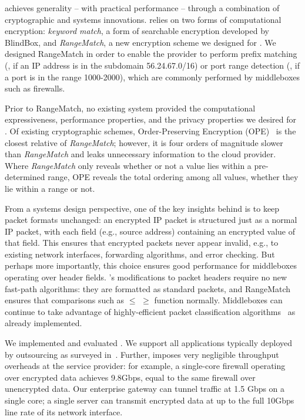 
    \sys achieves generality -- with practical performance -- through a combination of cryptographic and systems innovations.
    \sys relies on two forms of computational encryption: {\it keyword match}, a form of searchable encryption developed by BlindBox,  and {\it RangeMatch}, a new encryption scheme we designed for \sys.
    We designed RangeMatch in order to enable the provider to perform prefix matching (\eg{}, if an IP address is in the subdomain 56.24.67.0/16) or port range detection (\eg{}, if a port is in the range 1000-2000), which are commonly performed by middleboxes such as firewalls. 

    Prior to RangeMatch, no existing system provided the computational expressiveness, performance properties, and the privacy properties we desired for \sys.
    Of existing cryptographic schemes, Order-Preserving Encryption (OPE)~\cite{boldyreva:ope,popa:mope,popa:cryptdb} is the closest relative of {\it RangeMatch}; however, it is four orders of magnitude slower than {\it RangeMatch} and leaks unnecessary information to the cloud provider.
    Where {\em RangeMatch} only reveals whether or not a value lies within a pre-determined range, OPE reveals the total ordering among all values, whether they lie within a range or not.

  From a systems design perspective, one of the key insights behind \sys is to keep packet formats unchanged: an encrypted IP packet is structured just as a normal IP packet, with each field (e.g., source address) containing an encrypted value of that field.
  This ensures that encrypted packets never appear invalid, e.g., to existing network interfaces, forwarding algorithms, and error checking. 
  But perhaps more importantly, this choice ensures good performance for middleboxes operating over header fields. 
  \sys's modifications to packet headers require no new fast-path algorithms: they are formatted as standard packets, and RangeMatch ensures that comparisons such as $\leq$ $\geq$ function normally.
  Middleboxes can continue to take advantage of highly-efficient packet classification algorithms~\cite{packet_classif} as already implemented.
  

We implemented and evaluated \sys. We support all applications typically deployed by outsourcing as surveyed in~\cite{aplomb}.
Further, \sys imposes very negligible throughput overheads at the service provider: for example, a single-core firewall operating over encrypted data achieves 9.8Gbps, equal to the same firewall over unencrypted data.
Our enterprise gateway can tunnel traffic at 1.5 Gbps on a single core;  a single server can transmit \sys encrypted data at up to the full 10Gbps line rate of its network interface.


